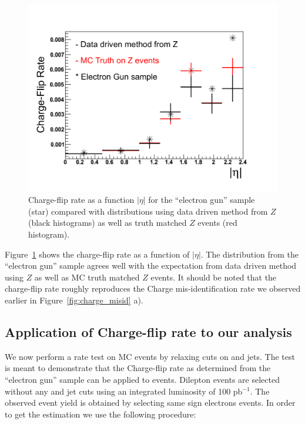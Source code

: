 \begin{figure}[htb]
\begin{center}
\includegraphics[width=0.7\linewidth]{figs/fr_rate.pdf}
\caption{Charge-flip rate as a function $|\eta|$ for the ``electron gun'' sample (star) compared with 
distributions using data driven method from $Z$ (black histograms) as well as truth matched $Z$ events 
(red histogram).\label{fig:charge_fliprate}}
\end{center}
\end{figure}

Figure~\ref{fig:charge_fliprate} shows the charge-flip rate as a function of $|\eta|$. The distribution from 
the ``electron gun'' sample agrees well with the expectation from data driven method
using $Z$ as well as MC truth matched $Z$ events. It should be noted that the charge-flip rate roughly 
reproduces the Charge mis-identification rate we observed earlier in Figure~\ref{fig:charge_misid} a).

\subsection{Application of Charge-flip rate to our analysis}

We now perform a rate test on \ttbar MC events by relaxing cuts on \met and jets. The test is meant
to demonstrate that the Charge-flip rate as determined from the ``electron gun'' sample can be applied
to \ttbar events. Dilepton events are selected without any \met and jet cuts using an integrated 
luminosity of 100 pb$^{-1}$. The observed event yield is obtained by selecting same sign electrons events.
In order to get the estimation we use the following procedure:

